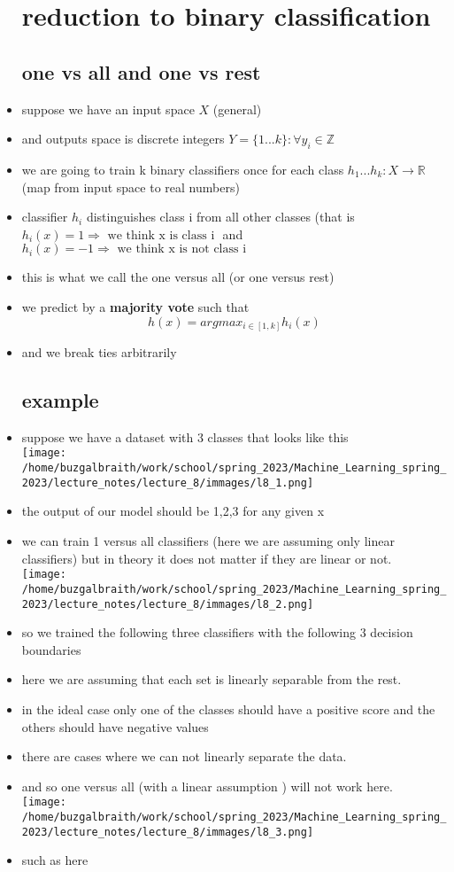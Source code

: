 \documentclass{article}
\begin{document}
\begin{itemize}
\section{reduction to binary classification}
\subsection*{one vs all and one vs rest }
\item suppose we have an input space $X$ (general)
\item and outputs space is discrete integers $Y=\{1...k\}:\forall y_i\in \mathbb{Z}$
\item we are going to train k binary classifiers once for each class $h_1...h_k:X\rightarrow \mathbb{R}$ (map from input space to real numbers)
\item classifier $h_i$ distinguishes class i from all other classes (that is $h_i(x)=1\Rightarrow \text{ we think x is class i } $ and $h_i(x)=-1\Rightarrow \text{ we think x is not class i } $
\item this is what we call the one versus all (or one versus rest)
\item we predict by a \textbf{majority vote } such that $$h(x)=argmax_{i\in [1,k]}h_i(x)$$
\item and we break ties arbitrarily 
\subsection*{example}
\item suppose we have a dataset with 3 classes that looks like this \\
\texttt{[image: /home/buzgalbraith/work/school/spring\_2023/Machine\_Learning\_spring\_2023/lecture\_notes/lecture\_8/immages/l8\_1.png]}
\item the output of our model should be 1,2,3 for any given x 
\item we can train 1 versus all classifiers (here we are assuming only linear classifiers) but in theory it does not matter if they are linear or not. 
\\ \texttt{[image: /home/buzgalbraith/work/school/spring\_2023/Machine\_Learning\_spring\_2023/lecture\_notes/lecture\_8/immages/l8\_2.png]}
\item so we trained the following three classifiers with the following 3 decision boundaries 
\item here we are assuming that each set is linearly separable from the rest. 
\item in the ideal case only one of the classes should have a positive score and the others should have negative values
\item there are cases where we can not linearly separate the data. 
\item and so one versus all (with a linear assumption ) will not work here. 
\\ \texttt{[image: /home/buzgalbraith/work/school/spring\_2023/Machine\_Learning\_spring\_2023/lecture\_notes/lecture\_8/immages/l8\_3.png]}
\item such as here 

\end{itemize}
\end{document}
